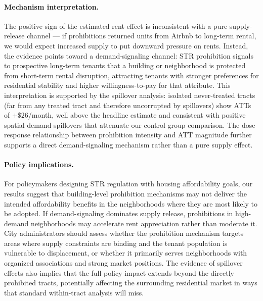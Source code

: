 \paragraph{Mechanism interpretation.} The positive sign of the estimated rent effect is inconsistent with a pure supply-release channel --- if prohibitions returned units from Airbnb to long-term rental, we would expect increased supply to put downward pressure on rents. Instead, the evidence points toward a demand-signaling channel: STR prohibition signals to prospective long-term tenants that a building or neighborhood is protected from short-term rental disruption, attracting tenants with stronger preferences for residential stability and higher willingness-to-pay for that attribute. This interpretation is supported by the spillover analysis: isolated never-treated tracts (far from any treated tract and therefore uncorrupted by spillovers) show ATTs of $+\$26$/month, well above the headline estimate and consistent with positive spatial demand spillovers that attenuate our control-group comparison. The dose-response relationship between prohibition intensity and ATT magnitude further supports a direct demand-signaling mechanism rather than a pure supply effect.

\paragraph{Policy implications.} For policymakers designing STR regulation with housing affordability goals, our results suggest that building-level prohibition mechanisms may not deliver the intended affordability benefits in the neighborhoods where they are most likely to be adopted. If demand-signaling dominates supply release, prohibitions in high-demand neighborhoods may accelerate rent appreciation rather than moderate it. City administrators should assess whether the prohibition mechanism targets areas where supply constraints are binding and the tenant population is vulnerable to displacement, or whether it primarily serves neighborhoods with organized associations and strong market positions. The evidence of spillover effects also implies that the full policy impact extends beyond the directly prohibited tracts, potentially affecting the surrounding residential market in ways that standard within-tract analysis will miss.

